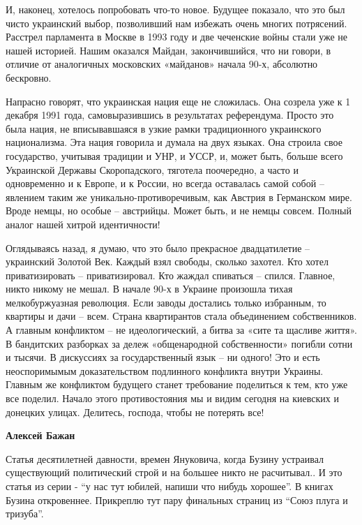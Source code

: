\begin{itemize}
\begin{itemize}
\begin{multicols}{2}
И, наконец, хотелось попробовать что-то новое. Будущее показало, что это был чисто украинский выбор, позволивший нам избежать очень многих потрясений. Расстрел парламента в Москве в 1993 году и две чеченские войны стали уже не нашей историей. Нашим оказался Майдан, закончившийся, что ни говори, в отличие от аналогичных московских «майданов» начала 90-х, абсолютно бескровно.


 
Напрасно говорят, что украинская нация еще не сложилась. Она созрела уже к 1
декабря 1991 года, самовыразившись в результатах референдума. Просто это была
нация, не вписывавшаяся в узкие рамки традиционного украинского национализма.
Эта нация говорила и думала на двух языках. Она строила свое государство,
учитывая традиции и УНР, и УССР, и, может быть, больше всего Украинской Державы
Скоропадского, тяготела поочередно, а часто и одновременно и к Европе, и к
России, но всегда оставалась самой собой – явлением таким же
уникально-противоречивым, как Австрия в Германском мире. Вроде немцы, но особые
– австрийцы. Может быть, и не немцы совсем. Полный аналог нашей хитрой
идентичности!

Оглядываясь назад, я думаю, что это было прекрасное двадцатилетие – украинский
Золотой Век. Каждый взял свободы, сколько захотел. Кто хотел приватизировать –
приватизировал. Кто жаждал спиваться – спился. Главное, никто никому не мешал.
В начале 90-х в Украине произошла тихая мелкобуржуазная революция. Если заводы
достались только избранным, то квартиры и дачи – всем. Страна квартирантов
стала объединением собственников. А главным конфликтом – не идеологический, а
битва за «сите та щасливе життя». В бандитских разборках за дележ «общенародной
собственности» погибли сотни и тысячи. В дискуссиях за государственный язык –
ни одного! Это и есть неоспоримымым доказательством подлинного конфликта внутри
Украины. Главным же конфликтом будущего станет требование поделиться к тем, кто
уже все поделил. Начало этого противостояния мы и видим сегодня на киевских и
донецких улицах. Делитесь, господа, чтобы не потерять все!
\end{multicols} %

\textbf{Алексей Бажан} 

Статья десятилетней давности, времен Януковича, когда Бузину устраивал
существующий политический строй и на большее никто не расчитывал.. И это статья
из серии - \enquote{у нас тут юбилей, напиши что нибудь хорошее}. В книгах Бузина
откровеннее. Прикреплю тут пару финальных страниц из \enquote{Союз плуга и тризуба}.


\end{itemize}
\end{itemize}
